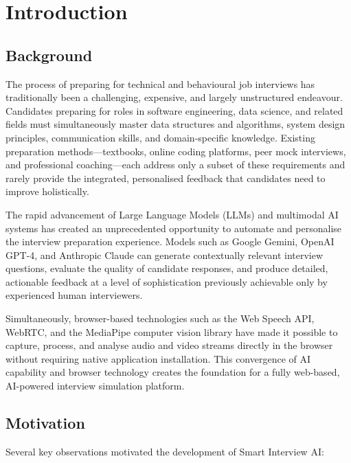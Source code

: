 \chapter{Introduction}

\section{Background}

The process of preparing for technical and behavioural job interviews has traditionally been a challenging, expensive, and largely unstructured endeavour. Candidates preparing for roles in software engineering, data science, and related fields must simultaneously master data structures and algorithms, system design principles, communication skills, and domain-specific knowledge. Existing preparation methods---textbooks, online coding platforms, peer mock interviews, and professional coaching---each address only a subset of these requirements and rarely provide the integrated, personalised feedback that candidates need to improve holistically.

The rapid advancement of Large Language Models (LLMs) and multimodal AI systems has created an unprecedented opportunity to automate and personalise the interview preparation experience. Models such as Google Gemini, OpenAI GPT-4, and Anthropic Claude can generate contextually relevant interview questions, evaluate the quality of candidate responses, and produce detailed, actionable feedback at a level of sophistication previously achievable only by experienced human interviewers.

Simultaneously, browser-based technologies such as the Web Speech API, WebRTC, and the MediaPipe computer vision library have made it possible to capture, process, and analyse audio and video streams directly in the browser without requiring native application installation. This convergence of AI capability and browser technology creates the foundation for a fully web-based, AI-powered interview simulation platform.

\section{Motivation}

Several key observations motivated the development of Smart Interview AI:

